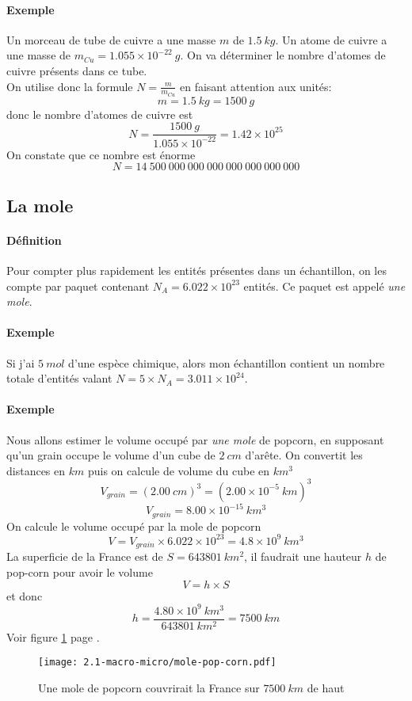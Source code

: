 \paragraph{Exemple} Un morceau de tube de cuivre a une masse $m$ de $1.5~kg$. Un atome de cuivre a une masse de $m_{Cu} =  1.055 \times 10^{-22}~g$. On va déterminer le nombre d'atomes de cuivre présents dans ce tube.\\ On utilise donc la formule $N= \frac{m}{m_{Cu}}$ en faisant attention aux unités:  $$m =  1.5~kg =  1500~g$$
donc le nombre d'atomes de cuivre est  $$N = \frac{1500~g}{1.055 \times 10^{-22}} = 1.42 \times 10^{25}$$
On constate que ce nombre est énorme 
$$ N = 14~500~000~000~000~000~000~000~000$$

\subsection{La mole}
\paragraph{Définition} Pour compter plus rapidement les entités présentes dans un échantillon, on les compte par paquet contenant $N_A = 6.022\times 10^{23}$ entités. Ce paquet est appelé \textit{une mole}.

\paragraph{Exemple} Si j'ai $5~mol$ d'une espèce chimique, alors mon échantillon contient un nombre totale d'entités valant $N = 5 \times N_A =  3.011\times 10^{24}$.

\paragraph{Exemple} Nous allons estimer le volume occupé par \textit{une mole} de popcorn, en supposant qu'un grain occupe le volume d'un cube de $2~cm$
d'arête. On convertit les distances en $km$ puis on calcule de volume du cube en $km^3$
$$ V_{grain} = \left( 2.00~cm \right)^3 = \left( 2.00 \times 10^{-5}~km \right)^3$$
$$ V_{grain} = 8.00 \times 10^{-15}~km^3$$
On calcule le volume occupé par la mole de popcorn 
$$ V = V_{grain} \times 6.022 \times 10^{23} = 4.8 \times 10^9 ~km^3$$
La superficie de la France est de $S=643801~km^2$, il faudrait une hauteur $h$ de pop-corn pour avoir
le volume $$V =  h \times S$$
et donc $$ h = \frac{4.80 \times 10^9~km^3}{643801~km^2} = 7500~km$$
Voir figure \ref{fig:pop_corn} page \pageref{fig:pop_corn}.
\begin{figure}[!h]
    \begin{center}
	\texttt{[image: 2.1-macro-micro/mole-pop-corn.pdf]}
    \end{center}
    \caption{Une mole de popcorn couvrirait la France sur $7500~km$ de haut}
    \label{fig:pop_corn}
\end{figure}


